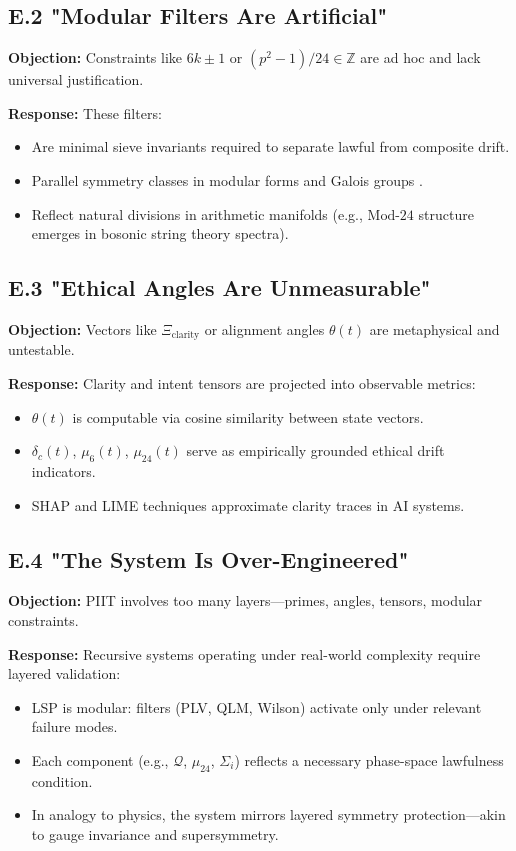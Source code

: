 \documentclass[12pt]{article}
\begin{document}
\subsection*{E.2 "Modular Filters Are Artificial"}

\textbf{Objection:} Constraints like $6k \pm 1$ or $(p^2 - 1)/24 \in \mathbb{Z}$ are ad hoc and lack universal justification.

\textbf{Response:}
These filters:
\begin{itemize}
  \item Are minimal sieve invariants required to separate lawful from composite drift.
  \item Parallel symmetry classes in modular forms and Galois groups \cite{serre1973}.
  \item Reflect natural divisions in arithmetic manifolds (e.g., $\text{Mod-24}$ structure emerges in bosonic string theory spectra).
\end{itemize}

\subsection*{E.3 "Ethical Angles Are Unmeasurable"}

\textbf{Objection:} Vectors like $\Xi_{\text{clarity}}$ or alignment angles $\theta(t)$ are metaphysical and untestable.

\textbf{Response:}
Clarity and intent tensors are projected into observable metrics:
\begin{itemize}
  \item $\theta(t)$ is computable via cosine similarity between state vectors.
  \item $\delta_c(t)$, $\mu_6(t)$, $\mu_{24}(t)$ serve as empirically grounded ethical drift indicators.
  \item SHAP \cite{lundberg2017} and LIME \cite{ribeiro2016} techniques approximate clarity traces in AI systems.
\end{itemize}

\subsection*{E.4 "The System Is Over-Engineered"}

\textbf{Objection:} PIIT involves too many layers—primes, angles, tensors, modular constraints.

\textbf{Response:}
Recursive systems operating under real-world complexity require layered validation:
\begin{itemize}
  \item LSP is modular: filters (PLV, QLM, Wilson) activate only under relevant failure modes.
  \item Each component (e.g., $\mathcal{Q}$, $\mu_{24}$, $\Sigma_i$) reflects a necessary phase-space lawfulness condition.
  \item In analogy to physics, the system mirrors layered symmetry protection—akin to gauge invariance and supersymmetry.
\end{itemize}
\end{document}
